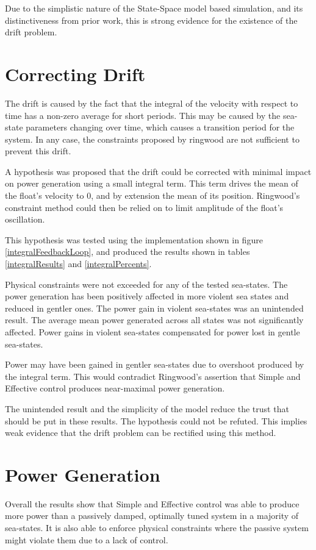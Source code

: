 \documentclass{report}
\begin{document}
Due to the simplistic nature of the State-Space model based simulation, and its distinctiveness from prior work, this is strong evidence for the existence of the drift problem.

\FloatBarrier
\section{Correcting Drift}
The drift is caused by the fact that the integral of the velocity with respect to time has a non-zero average for short periods. This may be caused by the sea-state parameters changing over time, which causes a transition period for the system. In any case, the constraints proposed by ringwood are not sufficient to prevent this drift.

A hypothesis was proposed that the drift could be corrected with minimal impact on power generation using a small integral term. This term drives the mean of the float's velocity to 0, and by extension the mean of its position. Ringwood's constraint method could then be relied on to limit amplitude of the float's oscillation.

This hypothesis was tested using the implementation shown in figure \ref{integralFeedbackLoop}, and produced the results shown in tables \ref{integralResults} and \ref{integralPercents}.

Physical constraints were not exceeded for any of the tested sea-states. The power generation has been positively affected in more violent sea states and reduced in gentler ones. The power gain in violent sea-states was an unintended result. The average mean power generated across all states was not significantly affected. Power gains in violent sea-states compensated for power lost in gentle sea-states.

Power may have been gained in gentler sea-states due to overshoot produced by the integral term. This would contradict Ringwood's assertion\cite{ringwood} that Simple and Effective control produces near-maximal power generation.

The unintended result and the simplicity of the model reduce the trust that should be put in these results. The hypothesis could not be refuted. This implies weak evidence that the drift problem can be rectified using this method.

\FloatBarrier
\section{Power Generation}
Overall the results show that Simple and Effective control was able to produce more power than a passively damped, optimally tuned system in a majority of sea-states. It is also able to enforce physical constraints where the passive system might violate them due to a lack of control.
\end{document}
